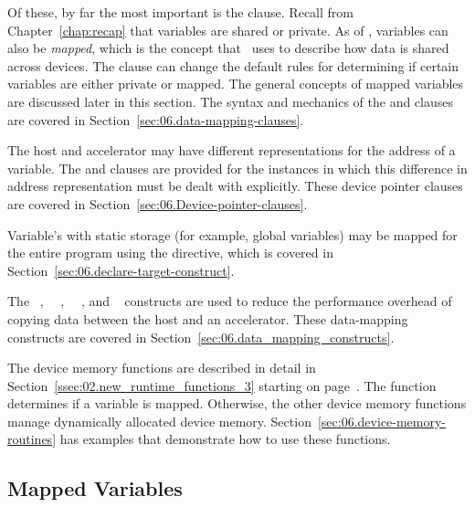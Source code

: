 Of these, by far the most important is the  clause.  Recall from
Chapter~\ref{chap:recap} that variables are shared or private.  As of \OMPfourzero,
variables can also be \emph{mapped}, which is the concept that \OMP\ uses to
describe how data is shared across devices.  The  clause can
change the default rules for determining if certain variables are either
private or mapped.  The general concepts of mapped variables
are discussed later in this section.  
The syntax and mechanics of the  and  clauses
are covered in Section~\ref{sec:06.data-mapping-clauses}.

The host and accelerator may have different representations for the address of
a variable.  The  and  clauses are
provided for the instances in which this difference in address representation
must be dealt with explicitly.  These device pointer clauses are covered in
Section~\ref{sec:06.Device-pointer-clauses}.

Variable's with static storage (for example, global variables) may be mapped
for the entire program using the  directive, which is
covered in Section~\ref{sec:06.declare-target-construct}.

The ~, ~~,
~~, and ~
constructs are used to reduce the performance overhead of copying data between
the host and an accelerator.  These data-mapping constructs are
covered in Section~\ref{sec:06.data_mapping_constructs}.

The device memory functions are described in detail in
Section~\ref{ssec:02.new_runtime_functions_3} starting on
page~\pageref{ssec:02.new_runtime_functions_3}.  
The  function determines if a variable
is mapped.  Otherwise, the other device memory functions 
manage dynamically allocated device memory.  
Section~\ref{sec:06.device-memory-routines} has examples 
that demonstrate how to use these functions.

\subsection{Mapped Variables}
\label{ssec:06.mapped-variables}

